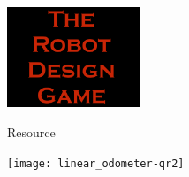 \documentclass[11pt]{article}
\begin{document}
\color{white}            
    
    \begin{center}
        
        \rule{0pt}{10mm}    


        \includegraphics[trim=5 5 5 5,clip,height=3cm]{rdg_logo}%
        
        \rule{0pt}{5mm}    
        
        

Resource



        \rule{0pt}{5mm}    

        \texttt{[image: linear\_odometer-qr2]}%

        

    \end{center}
\end{document}
